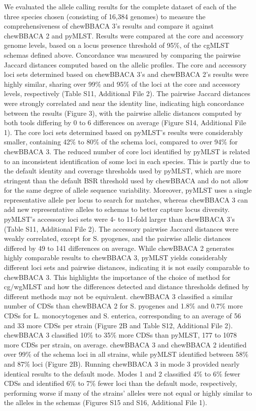 We evaluated the allele calling results for the complete dataset of each of the three species chosen (consisting of 16,384 genomes) to measure the comprehensiveness of chewBBACA 3's results and compare it against chewBBACA 2 and pyMLST. Results were compared at the core and accessory genome levels, based on a locus presence threshold of 95\%, of the cgMLST schemas defined above. Concordance was measured by comparing the pairwise Jaccard distances computed based on the allelic profiles. The core and accessory loci sets determined based on chewBBACA 3’s and chewBBACA 2’s results were highly similar, sharing over 99\% and 95\% of the loci at the core and accessory levels, respectively (Table S11, Additional File 2). The pairwise Jaccard distances were strongly correlated and near the identity line, indicating high concordance between the results (Figure 3), with the pairwise allelic distances computed by both tools differing by 0 to 6 differences on average (Figure S14, Additional File 1). The core loci sets determined based on pyMLST’s results were considerably smaller, containing 42\% to 80\% of the schema loci, compared to over 94\% for chewBBACA 3. The reduced number of core loci identified by pyMLST is related to an inconsistent identification of some loci in each species. This is partly due to the default identity and coverage thresholds used by pyMLST, which are more stringent than the default BSR threshold used by chewBBACA and do not allow for the same degree of allele sequence variability. Moreover, pyMLST uses a single representative allele per locus to search for matches, whereas chewBBACA 3 can add new representative alleles to schemas to better capture locus diversity. pyMLST's accessory loci sets were 4- to 11-fold larger than chewBBACA 3's (Table S11, Additional File 2). The accessory pairwise Jaccard distances were weakly correlated, except for S. pyogenes, and the pairwise allelic distances differed by 49 to 141 differences on average. While chewBBACA 2 generates highly comparable results to chewBBACA 3, pyMLST yields considerably different loci sets and pairwise distances, indicating it is not easily comparable to chewBBACA 3. This highlights the importance of the choice of method for cg/wgMLST and how the differences detected and distance thresholds defined by different methods may not be equivalent. chewBBACA 3 classified a similar number of CDSs than chewBBACA 2 for S. pyogenes and 1.8\% and 0.7\% more CDSs for L. monocytogenes and S. enterica, corresponding to an average of 56 and 33 more CDSs per strain (Figure 2B and Table S12, Additional File 2). chewBBACA 3 classified 10\% to 35\% more CDSs than pyMLST, 177 to 1078 more CDSs per strain, on average. chewBBACA 3 and chewBBACA 2 identified over 99\% of the schema loci in all strains, while pyMLST identified between 58\% and 87\% loci (Figure 2B). Running chewBBACA 3 in mode 3 provided nearly identical results to the default mode. Modes 1 and 2 classified 4\% to 6\% fewer CDSs and identified 6\% to 7\% fewer loci than the default mode, respectively, performing worse if many of the strains’ alleles were not equal or highly similar to the alleles in the schemas (Figures S15 and S16, Additional File 1).
